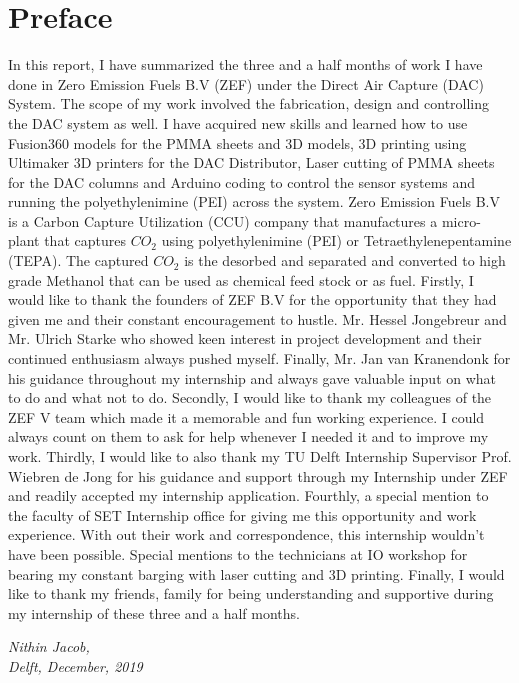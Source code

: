 \section*{Preface}

In this report, I have summarized the three and a half months of work I have done in Zero Emission Fuels B.V (ZEF) under the Direct Air Capture (DAC) System. The scope of my work involved the fabrication, design and controlling the DAC system as well. I have acquired new skills and learned how to use Fusion360 models for the PMMA sheets and 3D models, 3D printing using Ultimaker 3D printers for the DAC Distributor, Laser cutting of PMMA sheets for the DAC columns and Arduino coding to control the sensor systems and running the polyethylenimine (PEI) across the system. 
\bigbreak
\noindent
Zero Emission Fuels B.V is a Carbon Capture Utilization (CCU) company that manufactures a micro-plant that captures $CO_2$ using polyethylenimine (PEI) or Tetraethylenepentamine (TEPA). The captured $CO_2$ is the desorbed and separated and converted to high grade Methanol that can be used as chemical feed stock or as fuel. 
\bigbreak
\noindent
Firstly, I would like to thank the founders of ZEF B.V for the opportunity that they had given me and their constant encouragement to hustle. Mr. Hessel Jongebreur and Mr. Ulrich Starke who showed keen interest in project development and their continued enthusiasm always pushed myself. Finally, Mr. Jan van Kranendonk for his guidance throughout my internship and always gave valuable input on what to do and what not to do. 
\bigbreak
\noindent
Secondly, I would like to thank my colleagues of the ZEF V team which made it a memorable and fun working experience. I could always count on them to ask for help whenever I needed it and to improve my work. 
\bigbreak
\noindent
Thirdly, I would like to also thank my TU Delft Internship Supervisor Prof. Wiebren de Jong for his guidance and support through my Internship under ZEF and readily accepted my internship application.  
\bigbreak
\noindent
Fourthly, a special mention to the faculty of SET Internship office for giving me this opportunity and work experience. With out their work and correspondence, this internship wouldn't have been possible. Special mentions to the technicians at IO workshop for bearing my constant barging with laser cutting and 3D printing.
\bigbreak
\noindent
Finally, I would like to thank my friends, family for being understanding and supportive during my internship of these three and a half months.

\vspace{2cm}

\noindent
\textit{Nithin Jacob, \\
Delft, December, 2019}